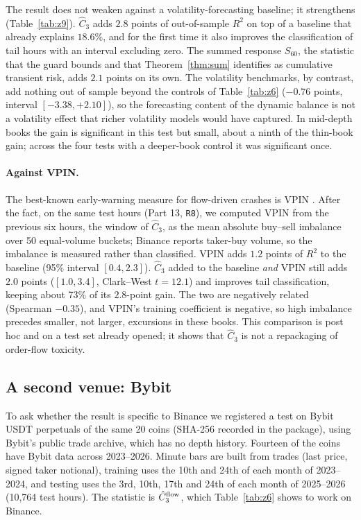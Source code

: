 \documentclass[12pt]{article}
\theoremstyle{definition}
\theoremstyle{remark}
\begin{document}
The result does not weaken against a volatility-forecasting baseline; it strengthens (Table~\ref{tab:z9}). $\hat C_3$ adds $2.8$ points of out-of-sample $R^2$ on top of a baseline that already explains $18.6\%$, and for the first time it also improves the classification of tail hours with an interval excluding zero. The summed response $S_{60}$, the statistic that the guard bounds and that Theorem~\ref{thm:sum} identifies as cumulative transient risk, adds $2.1$ points on its own. The volatility benchmarks, by contrast, add nothing out of sample beyond the controls of Table~\ref{tab:z6} ($-0.76$ points, interval $[-3.38,+2.10]$), so the forecasting content of the dynamic balance is not a volatility effect that richer volatility models would have captured. In mid-depth books the gain is significant in this test but small, about a ninth of the thin-book gain; across the four tests with a deeper-book control it was significant once.

\paragraph{Against VPIN.} The best-known early-warning measure for flow-driven crashes is VPIN \citep{easley2012}. After the fact, on the same test hours (Part 13, \texttt{R8}), we computed VPIN from the previous six hours, the window of $\hat C_3$, as the mean absolute buy--sell imbalance over 50 equal-volume buckets; Binance reports taker-buy volume, so the imbalance is measured rather than classified. VPIN adds $1.2$ points of $R^2$ to the baseline (95\% interval $[0.4,2.3]$). $\hat C_3$ added to the baseline \emph{and} VPIN still adds $2.0$ points ($[1.0,3.4]$, Clark--West $t=12.1$) and improves tail classification, keeping about 73\% of its $2.8$-point gain. The two are negatively related (Spearman $-0.35$), and VPIN's training coefficient is negative, so high imbalance precedes smaller, not larger, excursions in these books. This comparison is post hoc and on a test set already opened; it shows that $\hat C_3$ is not a repackaging of order-flow toxicity.

\subsection{A second venue: Bybit}\label{sec:bybit}
To ask whether the result is specific to Binance we registered a test on Bybit USDT perpetuals of the same 20 coins (SHA-256 recorded in the package), using Bybit's public trade archive, which has no depth history. Fourteen of the coins have Bybit data across 2023--2026. Minute bars are built from trades (last price, signed taker notional), training uses the 10th and 24th of each month of 2023--2024, and testing uses the 3rd, 10th, 17th and 24th of each month of 2025--2026 (10{,}764 test hours). The statistic is $\hat C_3^{\rm flow}$, which Table~\ref{tab:z6} shows to work on Binance.
\end{document}
